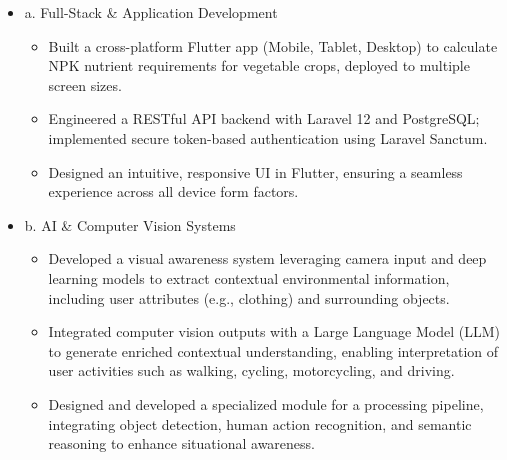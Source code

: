 \documentclass[a4paper,11pt]{article}
\begin{document}
\vspace{0mm}
\begin{itemize}[leftmargin=1.5ex, label={}]

\item{a. Full-Stack \& Application Development}
    \begin{itemize}[label=-]
        \item {Built a cross-platform Flutter app (Mobile, Tablet, Desktop) to calculate NPK nutrient requirements for vegetable crops, deployed to multiple screen sizes.}
        \item {Engineered a RESTful API backend with Laravel 12 and PostgreSQL; implemented secure token-based authentication using Laravel Sanctum.}
        \item {Designed an intuitive, responsive UI in Flutter, ensuring a seamless experience across all device form factors.}
    \end{itemize}

\item{b. AI \& Computer Vision Systems}
    \begin{itemize}[label=-]
        \item {Developed a visual awareness system leveraging camera input and deep learning models to extract contextual environmental information, including user attributes (e.g., clothing) and surrounding objects.}
        \item {Integrated computer vision outputs with a Large Language Model (LLM) to generate enriched contextual understanding, enabling interpretation of user activities such as walking, cycling, motorcycling, and driving.}
        \item {Designed and developed a specialized module for a processing pipeline, integrating object detection, human action recognition, and semantic reasoning to enhance situational awareness.}
    \end{itemize}
\end{itemize}
\end{document}
